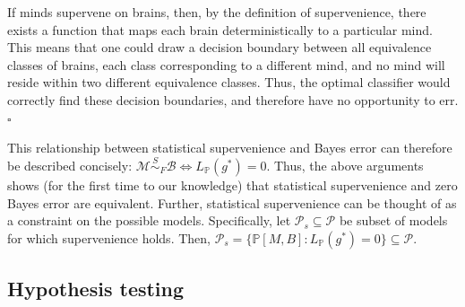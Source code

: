 \documentclass{article}
\newcommand{\mB}{\mathcal{B}}
\newcommand{\mM}{\mathcal{M}}
\newcommand{\PP}{\mathbb{P}}           %
\providecommand{\mc}[1]{\mathcal{#1}}
\newcommand{\MsB}{\mM \overset{S}{\sim}_F \mB}
\begin{document}
\noindent If minds supervene on brains, then, by the definition of supervenience, there exists a function that maps each brain deterministically to a particular mind.  This means that one could draw a decision boundary between all equivalence classes of brains, each class corresponding to a different mind, and no mind will reside within two different equivalence classes.  Thus, the optimal classifier would correctly find these decision boundaries, and therefore have no opportunity to err. $\square$

This relationship between statistical supervenience and Bayes error can therefore be described concisely: \mbox{$\MsB \Leftrightarrow L_{\PP}(g^*)=0$}.  Thus, the above arguments shows (for the first time to our knowledge) that statistical supervenience and zero Bayes error are equivalent. Further, statistical supervenience can be thought of as a constraint on the possible models.  Specifically, let $\mc{P}_s \subseteq \mc{P}$ be subset of models for which supervenience holds.  Then, $\mc{P}_s = \{\PP[M,B] : L_{\PP}(g^*)=0\} \subseteq \mc{P}$.


\subsection{Hypothesis testing} %
\label{sub:hypothesis_testing}
\end{document}
